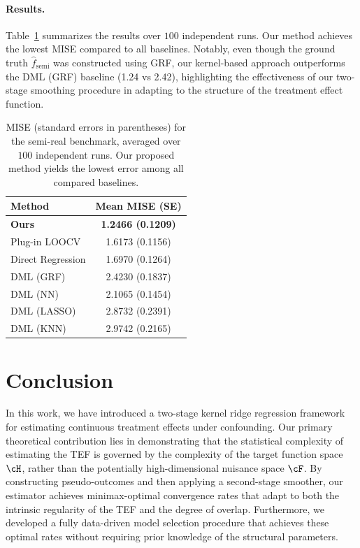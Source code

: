 \documentclass[english,11pt]{article}
\begin{document}
\paragraph{Results.}
Table~\ref{table:MISE_semi_real} summarizes the results over \(100\) independent runs. Our method achieves the lowest MISE compared to all baselines. Notably, even though the ground truth \(\hat f_{\mathrm{semi}}\) was constructed using GRF, our kernel-based approach outperforms the DML (GRF) baseline (1.24 vs 2.42), highlighting the effectiveness of our two-stage smoothing procedure in adapting to the structure of the treatment effect function.

\begin{table}[t]
    \centering
    \caption{MISE (standard errors in parentheses) for the semi-real benchmark, averaged over $100$ independent runs. Our proposed method yields the lowest error among all compared baselines.}
    \label{table:MISE_semi_real}
    \vspace{0.2cm}
    \begin{tabular}{lc}
        \toprule
        Method & Mean MISE (SE) \\
        \midrule
        \textbf{Ours}       & \textbf{1.2466 (0.1209)} \\
        Plug-in LOOCV       & 1.6173 (0.1156) \\
        Direct Regression   & 1.6970 (0.1264) \\
        DML (GRF)           & 2.4230 (0.1837) \\
        DML (NN)            & 2.1065 (0.1454) \\
        DML (LASSO)         & 2.8732 (0.2391) \\
        DML (KNN)           & 2.9742 (0.2165) \\
        \bottomrule
    \end{tabular}
\end{table}


\section{Conclusion}\label{section: conclusion}

In this work, we have introduced a two-stage kernel ridge regression framework for estimating continuous treatment effects under confounding. Our primary theoretical contribution lies in demonstrating that the statistical complexity of estimating the TEF is governed by the complexity of the target function space $\cH$, rather than the potentially high-dimensional nuisance space $\cF$.
By constructing pseudo-outcomes and then applying a second-stage smoother, our estimator achieves minimax-optimal convergence rates that adapt to both the intrinsic regularity of the TEF and the degree of overlap. Furthermore, we developed a fully data-driven model selection procedure that achieves these optimal rates without requiring prior knowledge of the structural parameters.
\end{document}
